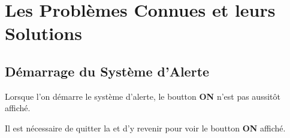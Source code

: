 \chapter{Les Probl\`emes Connues et leurs Solutions}\label{chap:problemes-connues}


\vspace{2cm}

\section{D\'emarrage du Syst\`eme d'Alerte}

Lorsque l'on d\'emarre le syst\`eme d'alerte,
le boutton \textbf{\textcolor{yerothColorGreen}{ON}}
n'est pas aussit\^ot affich\'e.

Il est n\'ecessaire de quitter la \fenetre et d'y
revenir pour voir le boutton \textbf{\textcolor{yerothColorGreen}{ON}}
affich\'e.

